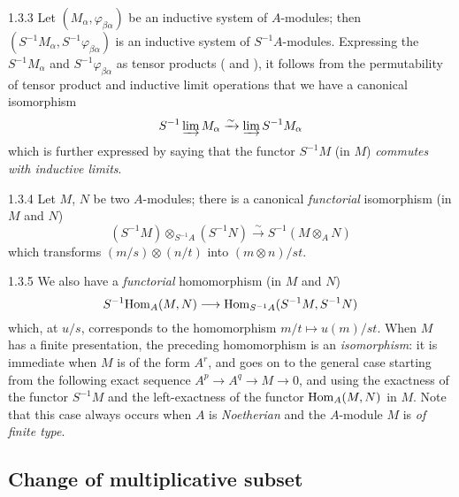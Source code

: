 \documentclass{book}
\begin{document}
\begin{env}{1.3.3}
\label{env-0.1.3.3}
Let $(M_\alpha,\varphi_{\beta\alpha})$ be an inductive system of $A$-modules; then
$(S^{-1}M_\alpha,S^{-1}\varphi_{\beta\alpha})$ is an inductive system of $S^{-1}A$-modules.
Expressing the $S^{-1}M_\alpha$ and $S^{-1}\varphi_{\beta\alpha}$ as tensor products ( and ),
it follows from the permutability of tensor product and inductive limit operations that we have a canonical isomorphism
\[
  S^{-1}\varinjlim M_\alpha\xrightarrow{\sim}\varinjlim S^{-1}M_\alpha
\]
which is further expressed by saying that the functor $S^{-1}M$ (in $M$) \emph{commutes with inductive limits}.
\end{env}

\begin{env}{1.3.4}
\label{env-0.1.3.4}
Let $M$, $N$ be two $A$-modules; there is a canonical \emph{functorial} isomorphism (in $M$ and $N$)
\[
  (S^{-1}M)\otimes_{S^{-1}A}(S^{-1}N)\xrightarrow{\sim}S^{-1}(M\otimes_A N)
\]
which transforms $(m/s)\otimes(n/t)$ into $(m\otimes n)/st$.
\end{env}

\begin{env}{1.3.5}
\label{env-0.1.3.5}
We also have a \emph{functorial} homomorphism (in $M$ and $N$)
\[
  S^{-1}{\mathop{\mathrm{Hom}}\nolimits}_A(M,N)\longrightarrow{\mathop{\mathrm{Hom}}\nolimits}_{S^{-1}A}(S^{-1}M,S^{-1}N)
\]
which, at $u/s$, corresponds to the homomorphism $m/t\mapsto u(m)/st$. When $M$ has a finite presentation, the
preceding homomorphism is an \emph{isomorphism}: it is immediate when $M$ is of the form $A^r$, and goes on to the general
case starting from the following exact sequence $A^p\to A^q\to M\to 0$, and using the exactness of the functor $S^{-1}M$ and
the left-exactness of the functor ${\mathop{\mathrm{Hom}}\nolimits}_A(M,N)$ in $M$. Note that this case always occurs when $A$ is \emph{Noetherian} and the
$A$-module $M$ is \emph{of finite type}.
\end{env}

\subsection{Change of multiplicative subset}
\label{0-prelim-1.4}
\end{document}
